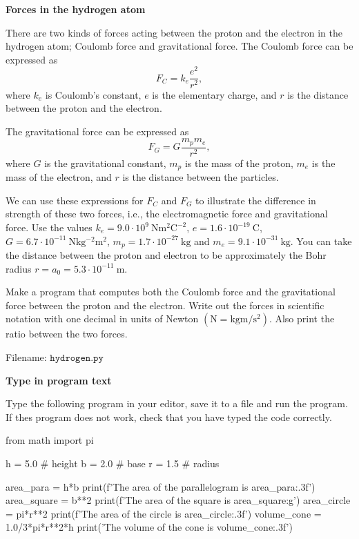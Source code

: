 \begin{Problem}{\textbf{Forces in the hydrogen atom}}\label{prob15}

\noindent There are two kinds of forces acting between the proton and the electron in the
hydrogen atom; Coulomb force and gravitational force. The Coulomb force can be
expressed as
\begin{equation*}
F_C = k_e \frac{e^2}{r^2},
\end{equation*}
where $k_e$ is Coulomb's constant, $e$ is the elementary charge, and $r$ is the
distance between the proton and the electron.

The gravitational force can be expressed as
\begin{equation*}
F_G = G\frac{m_pm_e}{r^2},
\end{equation*}
where $G$ is the gravitational constant, $m_p$ is the mass of the proton, $m_e$
is the mass of the electron, and $r$ is the distance between the particles.

We can use these expressions for $F_C$ and $F_G$ to illustrate the difference in
strength of these two forces, i.e., the electromagnetic force and gravitational force.
Use the values
$k_e = 9.0\cdot 10^9 \ \mathrm{Nm^2C^{-2}}$,
$e = 1.6\cdot 10^{-19} \ \mathrm{C}$, $G = 6.7\cdot 10^{-11} \ \mathrm{Nkg^{-2}m^2}$,
$m_p = 1.7\cdot 10^{-27} \ \mathrm{kg}$ and $m_e = 9.1 \cdot 10^{-31} \ \mathrm{kg}$.
You can take the distance between the proton and electron to be approximately
the Bohr radius $r = a_0 = 5.3\cdot 10^{-11} \ \mathrm{m}$.

Make a program that computes both the Coulomb force and the gravitational force
between the proton and the electron. Write out the forces in scientific notation
with one decimal in units of Newton $(\mathrm{N = kg m/s^2})$. Also print the
ratio between the two forces.

Filename: $\texttt{hydrogen.py}$
\end{Problem}

\begin{Problem}{\textbf{Type in program text}}\label{formulas_shapes}

\noindent Type the following program in your editor, save it to a file
 and run the program. If thes program does
not work, check that you have typed the code correctly.
\begin{python}
from math import pi

h = 5.0 # height
b = 2.0 # base
r = 1.5 # radius

area_para = h*b
print(f'The area of the parallelogram is {area_para:.3f}')
area_square = b**2
print(f'The area of the square is {area_square:g}')
area_circle = pi*r**2
print(f'The area of the circle is {area_circle:.3f}')
volume_cone = 1.0/3*pi*r**2*h
print('The volume of the cone is {volume_cone:.3f}')
\end{python}
\end{Problem}

